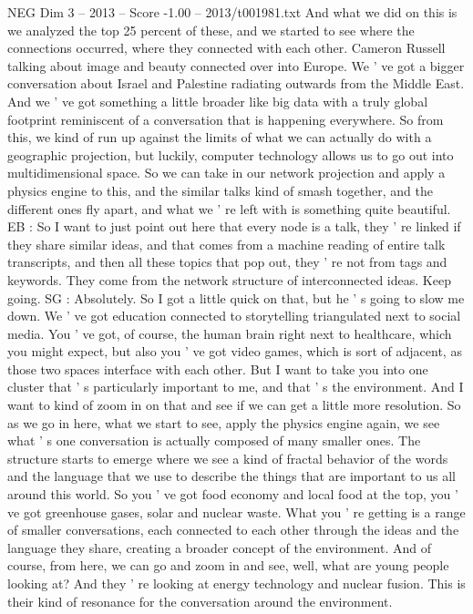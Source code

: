 \begin{textsample}{NEG Dim 3 – 2013 – Score -1.00 – 2013/t001981.txt}
And what we did on this is we analyzed the top 25 percent of these, and we started to see where the connections occurred, where they connected with each other.
Cameron Russell talking about image and beauty connected over into Europe.
We ' ve got a bigger conversation about Israel and Palestine radiating outwards from the Middle East.
And we ' ve got something a little broader like big data with a truly global footprint reminiscent of a conversation that is happening everywhere.
So from this, we kind of run up against the limits of what we can actually do with a geographic projection, but luckily, computer technology allows us to go out into multidimensional space.
So we can take in our network projection and apply a physics engine to this, and the similar talks kind of smash together, and the different ones fly apart, and what we ' re left with is something quite beautiful.
EB : So I want to just point out here that every node is a talk, they ' re linked if they share similar ideas, and that comes from a machine reading of entire talk transcripts, and then all these topics that pop out, they ' re not from tags and keywords.
They come from the network structure of interconnected ideas.
Keep going.
SG : Absolutely.
So I got a little quick on that, but he ' s going to slow me down.
We ' ve got education connected to storytelling triangulated next to social media.
You ' ve got, of course, the human brain right next to healthcare, which you might expect, but also you ' ve got video games, which is sort of adjacent, as those two spaces interface with each other.
But I want to take you into one cluster that ' s particularly important to me, and that ' s the environment.
And I want to kind of zoom in on that and see if we can get a little more resolution.
So as we go in here, what we start to see, apply the physics engine again, we see what ' s one conversation is actually composed of many smaller ones.
The structure starts to emerge where we see a kind of fractal behavior of the words and the language that we use to describe the things that are important to us all around this world.
So you ' ve got food economy and local food at the top, you ' ve got greenhouse gases, solar and nuclear waste.
What you ' re getting is a range of smaller conversations, each connected to each other through the ideas and the language they share, creating a broader concept of the environment.
And of course, from here, we can go and zoom in and see, well, what are young people looking at?
And they ' re looking at energy technology and nuclear fusion.
This is their kind of resonance for the conversation around the environment.

\end{textsample}
